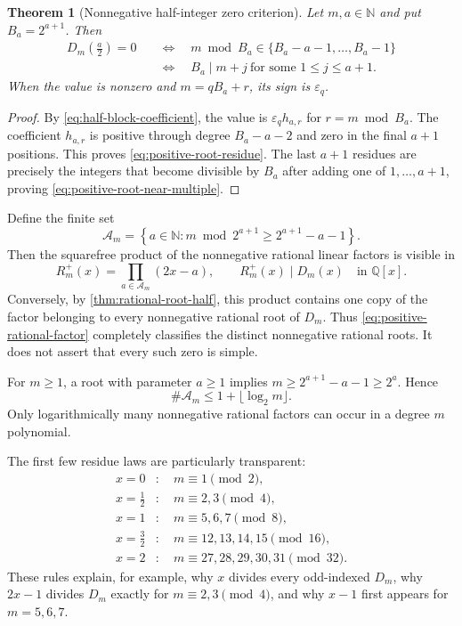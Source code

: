 \documentclass[11pt,oneside]{article}
\newtheorem{theorem}{Theorem}[section]
\theoremstyle{definition}
\theoremstyle{remark}
\newcommand{\N}{\mathbb N}
\newcommand{\Q}{\mathbb Q}
\newcommand{\eps}{\varepsilon}
\newcommand{\Diag}{D}
\begin{document}
\begin{theorem}[Nonnegative half-integer zero criterion]
\label{thm:positive-half-roots}
Let $m,a\in\N$ and put $B_a=2^{a+1}$.  Then
\begin{align}
 \Diag_m\!\left(\frac a2\right)=0
 &\quad\Longleftrightarrow\quad
 m\bmod B_a\in\{B_a-a-1,\ldots,B_a-1\}
 \label{eq:positive-root-residue}\\
 &\quad\Longleftrightarrow\quad
 B_a\mid m+j\ \text{for some }1\le j\le a+1.
 \label{eq:positive-root-near-multiple}
\end{align}
When the value is nonzero and $m=qB_a+r$, its sign is $\eps_q$.
\end{theorem}

\begin{proof}
By \eqref{eq:half-block-coefficient}, the value is
$\eps_qh_{a,r}$ for $r=m\bmod B_a$.  The coefficient $h_{a,r}$ is positive
through degree $B_a-a-2$ and zero in the final $a+1$ positions.  This proves
\eqref{eq:positive-root-residue}.  The last $a+1$ residues are precisely the
integers that become divisible by $B_a$ after adding one of
$1,\ldots,a+1$, proving \eqref{eq:positive-root-near-multiple}.
\end{proof}

Define the finite set
\begin{equation}
 \mathcal A_m=
 \left\{a\in\N:
  m\bmod 2^{a+1}\ge2^{a+1}-a-1
 \right\}.
 \label{eq:Am}
\end{equation}
Then the squarefree product of the nonnegative rational linear factors is
visible in
\begin{equation}
 R_m^+(x)=\prod_{a\in\mathcal A_m}(2x-a),
 \qquad
 R_m^+(x)\mid\Diag_m(x)\quad\text{in }\Q[x].
 \label{eq:positive-rational-factor}
\end{equation}
Conversely, by \cref{thm:rational-root-half}, this product contains one copy
of the factor belonging to every nonnegative rational root of $\Diag_m$.
Thus \eqref{eq:positive-rational-factor} completely classifies the distinct
nonnegative rational roots.  It does not assert that every such zero is
simple.

For $m\ge1$, a root with parameter $a\ge1$ implies
$m\ge2^{a+1}-a-1\ge2^a$.  Hence
\begin{equation}
 \#\mathcal A_m\le1+\lfloor\log_2m\rfloor.
 \label{eq:root-count-bound}
\end{equation}
Only logarithmically many nonnegative rational factors can occur in a degree
$m$ polynomial.

The first few residue laws are particularly transparent:
\begin{align*}
 x=0&:\quad m\equiv1\pmod2,\\
 x=\tfrac12&:\quad m\equiv2,3\pmod4,\\
 x=1&:\quad m\equiv5,6,7\pmod8,\\
 x=\tfrac32&:\quad m\equiv12,13,14,15\pmod{16},\\
 x=2&:\quad m\equiv27,28,29,30,31\pmod{32}.
\end{align*}
These rules explain, for example, why $x$ divides every odd-indexed
$\Diag_m$, why $2x-1$ divides $\Diag_m$ exactly for
$m\equiv2,3\pmod4$, and why $x-1$ first appears for $m=5,6,7$.
\end{document}
